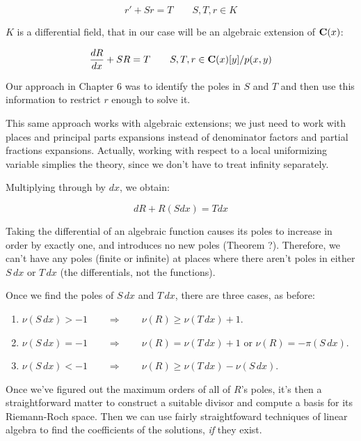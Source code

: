 \begin{equation}
r' + S r = T \qquad S,T,r \in K
\end{equation}

$K$ is a differential field, that in our case will be an algebraic
extension of $\mathbf{C}(x)$:

\begin{equation}
\label{eq: simple algebraic Risch}
\frac{dR}{dx} + S R = T \qquad S,T,r \in \mathbf{C}(x)[y]/p(x,y)
\end{equation}

Our approach in Chapter 6 was to identify the poles in $S$ and $T$
and then use this information to restrict $r$ enough to solve it.

This same approach works with algebraic extensions; we just need to
work with places and principal parts expansions instead of denominator
factors and partial fractions expansions.  Actually, working
with respect to a local uniformizing variable simplies the
theory, since we don't have to treat infinity separately.

Multiplying through by $dx$, we obtain:

\begin{equation}
dR + R(S dx) = T dx
\end{equation}

Taking the differential of an algebraic function causes its
poles to increase in order by exactly one, and introduces no new poles (Theorem ?).
Therefore, we can't have any poles (finite or infinite) at places
where there aren't poles in either $S\, dx$ or $T\, dx$ (the
differentials, not the functions).

Once we find the poles of $S\,dx$ and $T\,dx$, there are three cases,
as before:

\begin{enumerate}
\item $\nu(S\, dx)>-1 \qquad\Longrightarrow\qquad \nu(R) \ge \nu(T\, dx)+1$. 
\item $\nu(S\, dx)=-1 \qquad\Longrightarrow\qquad \nu(R)=\nu(T\, dx)+1$ or $\nu(R)=-\pi(S\,dx)$. 
\item $\nu(S\, dx)<-1 \qquad\Longrightarrow\qquad \nu(R) \ge \nu(T\, dx) - \nu(S\, dx)$. 
\end{enumerate}

Once we've figured out the maximum orders of all of $R$'s poles, it's
then a straightforward matter to construct a suitable divisor and
compute a basis for its Riemann-Roch space.  Then we can use fairly
straightfoward techniques of linear algebra to find the coefficients
of the solutions, {\it if} they exist.

